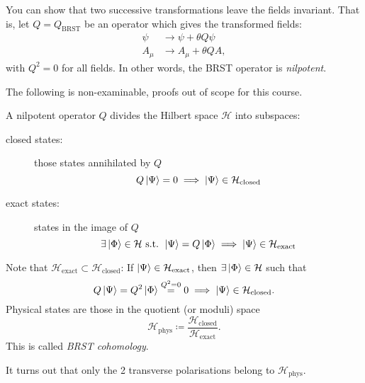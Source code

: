 You can show that two successive transformations leave the fields invariant. That is, let $Q = Q_{\text{BRST}}$ be an operator which gives the transformed fields:
\begin{align}
  \psi &\to \psi + \theta Q \psi \\
  A_{\mu} &\to A_{\mu} + \theta Q A,
\end{align}
with $Q^2  =0$ for all fields.
In other words, the BRST operator is \emph{nilpotent}.

\begin{leftbar}
  The following is non-examinable, proofs out of scope for this course.
\end{leftbar}

A nilpotent operator $Q$ divides the Hilbert space $\mathcal{H}$ into subspaces:
\begin{description}
  \item[closed states:] those states annihilated by $Q$
    \begin{equation}
      Q \ket{\Psi} = 0 \implies \ket{\Psi} \in \mathcal{H}_{\text{closed}}
    \end{equation}
  \item[exact states:] states in the image of $Q$
    \begin{equation}
      \exists \ket{\Phi} \in \mathcal{H} \text{ s.t. } \ket{\Psi} = Q \ket{\Phi} \implies \ket{\Psi} \in \mathcal{H}_{\text{exact}}
    \end{equation}
\end{description}
Note that $\mathcal{H}_{\text{exact}} \subset \mathcal{H}_{\text{closed}}$: If $\ket{\Psi} \in \mathcal{H}_{\text{exact}}$, then $\exists \ket{\Phi} \in \mathcal{H}$ such that
\begin{equation}
  Q \ket{\Psi} = Q^2 \ket{\Phi} \stackrel{Q^2 = 0}{=} 0 \implies \ket{\Psi} \in \mathcal{H}_{\text{closed}}.
\end{equation}
Physical states are those in the quotient (or moduli) space
\begin{equation}
  \mathcal{H}_{\text{phys}} \coloneqq \frac{\mathcal{H}_{\text{closed}}}{\mathcal{H}_{\text{exact}}}.
\end{equation}
This is called \emph{BRST cohomology}.

It turns out that only the 2 transverse polarisations belong to $\mathcal{H}_{\text{phys}}$.

